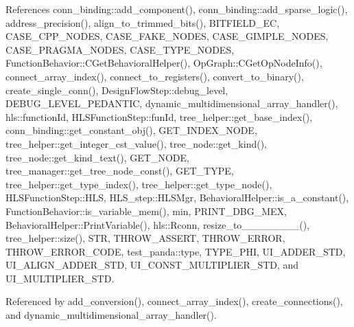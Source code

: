 References conn\+\_\+binding\+::add\+\_\+component(), conn\+\_\+binding\+::add\+\_\+sparse\+\_\+logic(), address\+\_\+precision(), align\+\_\+to\+\_\+trimmed\+\_\+bits(), B\+I\+T\+F\+I\+E\+L\+D\+\_\+\+EC, C\+A\+S\+E\+\_\+\+C\+P\+P\+\_\+\+N\+O\+D\+ES, C\+A\+S\+E\+\_\+\+F\+A\+K\+E\+\_\+\+N\+O\+D\+ES, C\+A\+S\+E\+\_\+\+G\+I\+M\+P\+L\+E\+\_\+\+N\+O\+D\+ES, C\+A\+S\+E\+\_\+\+P\+R\+A\+G\+M\+A\+\_\+\+N\+O\+D\+ES, C\+A\+S\+E\+\_\+\+T\+Y\+P\+E\+\_\+\+N\+O\+D\+ES, Function\+Behavior\+::\+C\+Get\+Behavioral\+Helper(), Op\+Graph\+::\+C\+Get\+Op\+Node\+Info(), connect\+\_\+array\+\_\+index(), connect\+\_\+to\+\_\+registers(), convert\+\_\+to\+\_\+binary(), create\+\_\+single\+\_\+conn(), Design\+Flow\+Step\+::debug\+\_\+level, D\+E\+B\+U\+G\+\_\+\+L\+E\+V\+E\+L\+\_\+\+P\+E\+D\+A\+N\+T\+IC, dynamic\+\_\+multidimensional\+\_\+array\+\_\+handler(), hls\+::function\+Id, H\+L\+S\+Function\+Step\+::fun\+Id, tree\+\_\+helper\+::get\+\_\+base\+\_\+index(), conn\+\_\+binding\+::get\+\_\+constant\+\_\+obj(), G\+E\+T\+\_\+\+I\+N\+D\+E\+X\+\_\+\+N\+O\+DE, tree\+\_\+helper\+::get\+\_\+integer\+\_\+cst\+\_\+value(), tree\+\_\+node\+::get\+\_\+kind(), tree\+\_\+node\+::get\+\_\+kind\+\_\+text(), G\+E\+T\+\_\+\+N\+O\+DE, tree\+\_\+manager\+::get\+\_\+tree\+\_\+node\+\_\+const(), G\+E\+T\+\_\+\+T\+Y\+PE, tree\+\_\+helper\+::get\+\_\+type\+\_\+index(), tree\+\_\+helper\+::get\+\_\+type\+\_\+node(), H\+L\+S\+Function\+Step\+::\+H\+LS, H\+L\+S\+\_\+step\+::\+H\+L\+S\+Mgr, Behavioral\+Helper\+::is\+\_\+a\+\_\+constant(), Function\+Behavior\+::is\+\_\+variable\+\_\+mem(), min, P\+R\+I\+N\+T\+\_\+\+D\+B\+G\+\_\+\+M\+EX, Behavioral\+Helper\+::\+Print\+Variable(), hls\+::\+Rconn, resize\+\_\+to\+\_\+\_\+\_\+\_\+\_\+\_\+\_\+\_(), tree\+\_\+helper\+::size(), S\+TR, T\+H\+R\+O\+W\+\_\+\+A\+S\+S\+E\+RT, T\+H\+R\+O\+W\+\_\+\+E\+R\+R\+OR, T\+H\+R\+O\+W\+\_\+\+E\+R\+R\+O\+R\+\_\+\+C\+O\+DE, test\+\_\+panda\+::type, T\+Y\+P\+E\+\_\+\+P\+HI, U\+I\+\_\+\+A\+D\+D\+E\+R\+\_\+\+S\+TD, U\+I\+\_\+\+A\+L\+I\+G\+N\+\_\+\+A\+D\+D\+E\+R\+\_\+\+S\+TD, U\+I\+\_\+\+C\+O\+N\+S\+T\+\_\+\+M\+U\+L\+T\+I\+P\+L\+I\+E\+R\+\_\+\+S\+TD, and U\+I\+\_\+\+M\+U\+L\+T\+I\+P\+L\+I\+E\+R\+\_\+\+S\+TD.



Referenced by add\+\_\+conversion(), connect\+\_\+array\+\_\+index(), create\+\_\+connections(), and dynamic\+\_\+multidimensional\+\_\+array\+\_\+handler().

